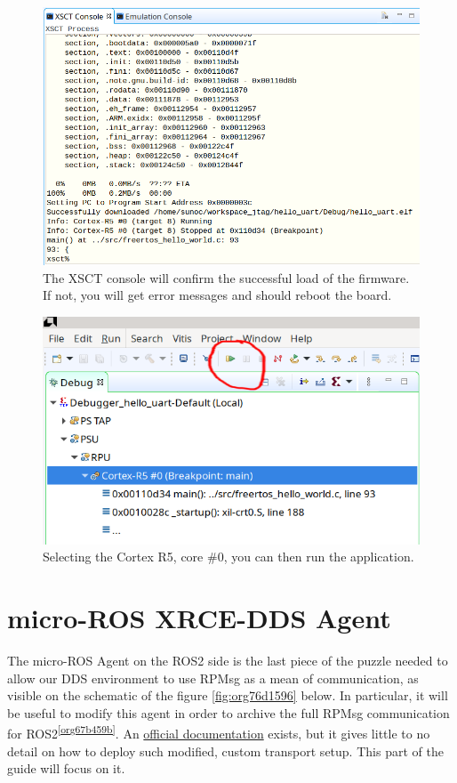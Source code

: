 \documentclass[10pt]{article}
\begin{document}
\begin{figure}[htbp]
\centering
\includegraphics[width=.6\textwidth]{./img/jtag/console.png}
\caption{\label{fig:org1578220}The XSCT console will confirm the successful load of the firmware. If not, you will get error messages and should reboot the board.}
\end{figure}

\begin{figure}[htbp]
\centering
\includegraphics[width=.6\textwidth]{./img/jtag/run.png}
\caption{\label{fig:orga2881d7}Selecting the Cortex R5, core \#0, you can then run the application.}
\end{figure}

\clearpage
\section{micro-ROS XRCE-DDS Agent}
\label{sec:org824bdd2}
The micro-ROS Agent on the ROS2 side is the last piece of the puzzle needed to
allow our DDS environment to use RPMsg as a mean of communication, as visible
on the schematic of the figure \ref{fig:org76d1596} below.
In particular, it will be useful to modify this agent in order to archive
the full RPMsg communication for ROS2\textsuperscript{\ref{org67b459b}}.
An \href{https://micro.ros.org/docs/tutorials/advanced/create\_custom\_transports/}{official documentation} exists, but it gives little to no detail
on how to deploy such modified, custom transport setup.
This part of the guide will focus on it.
\end{document}
